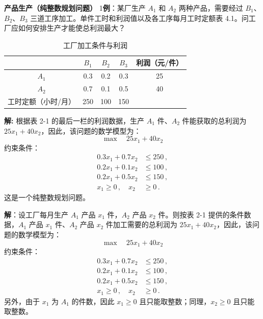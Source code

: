 \begin{exbox}{\textbf{产品生产（纯整数规划问题）}}
    1\textbf{例}：某厂生产 $A_1$ 和 $A_2$ 两种产品，需要经过 $B_1$、$B_2$、$B_3$ 三道工序加工。单件工时和利润值以及各工序每月工时定额表 4.1。问工厂应如何安排生产才能使总利润最大？
    
    \begin{table}[H]
        \centering
        \label{tab:4.1}
        \renewcommand{\arraystretch}{1.5}
        \begin{tabular}{|c|c|c|c|c|}
            \hline
            & $B_1$ & $B_2$ & $B_3$ & 利润（元/件） \\ \hline
            $A_1$ & 0.3 & 0.2 & 0.3 & 25 \\ \hline
            $A_2$ & 0.7 & 0.1 & 0.5 & 40 \\ \hline
            工时定额（小时/月） & 250 & 100 & 150 & \\ \hline
        \end{tabular}
        \caption{工厂加工条件与利润}
    \end{table}
    
    \textbf{解:} 根据表 2-1 的最后一栏的利润数据，生产 $A_1$ 件、$A_2$ 件能获取的总利润为 $25x_1 + 40x_2$，因此，该问题的数学模型为：
    \begin{equation}
        \max \quad 25x_1 + 40x_2 \label{eq:Chapter4_obj_1}
    \end{equation}
    约束条件：
    \begin{align}
        0.3x_1 + 0.7x_2 &\leq 250 \,, \label{eq:c1} \\
        0.2x_1 + 0.1x_2 &\leq 100 \,, \label{eq:c2} \\
        0.2x_1 + 0.5x_2 &\leq 150 \,, \label{eq:c3} \\
        x_1 \geq 0 \,, \quad x_2 &\geq 0 \,. \label{eq:Chapter4_nonneg_1}
    \end{align}
    这是一个纯整数规划问题。
    
    \textbf{解}：设工厂每月生产 $A_1$ 产品 $x_1$ 件，$A_2$ 产品 $x_2$ 件。则按表 2-1 提供的条件数据，$A_1$ 产品 $x_1$ 件、$A_2$ 产品 $x_2$ 件加工需要的总利润为 $25x_1 + 40x_2$，因此，该问题的数学模型为：
    \begin{equation}
        \max \quad 25x_1 + 40x_2
    \end{equation}
    约束条件：
    \begin{align}
        0.3x_1 + 0.7x_2 &\leq 250 \,, \tag{$B_1$ 工序，工时限制} \\
        0.2x_1 + 0.1x_2 &\leq 100 \,, \tag{$B_2$ 工序，工时限制} \\
        0.2x_1 + 0.5x_2 &\leq 150 \,, \tag{$B_3$ 工序，工时限制} \\
        x_1 \geq 0 \,, \quad x_2 &\geq 0 \,. \tag{且只能整数}
    \end{align}
    另外，由于 $x_1$ 为 $A_1$ 的件数，因此 $x_1 \geq 0$ 且只能取整数；同理，$x_2 \geq 0$ 且只能取整数。
\end{exbox}


